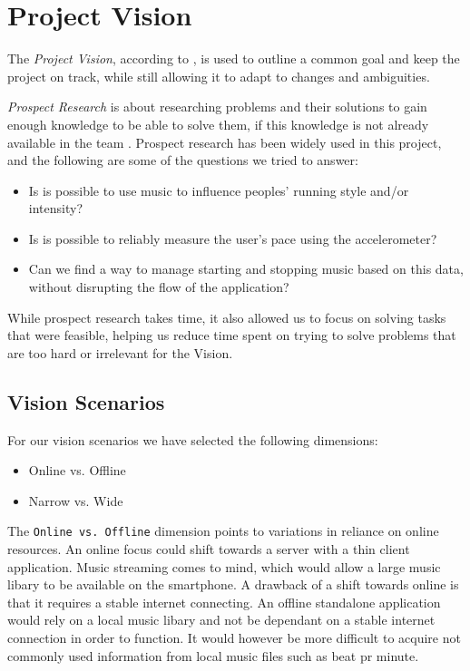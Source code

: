 \section{Project Vision}
The \textit{Project Vision}, according to \citet[ p. 104]{essence}, is used to outline a common goal and keep the project on track, while still allowing it to adapt to changes and ambiguities.

\noindent \textit{Prospect Research} is about researching problems and their solutions to gain enough knowledge to be able to solve them, if this knowledge is not already available in the team \citep[ pp. 104-105]{essence}.
Prospect research has been widely used in this project, and the following are some of the questions we tried to answer:

\begin{itemize}
	\item Is is possible to use music to influence peoples' running style and/or intensity?
	\item Is is possible to reliably measure the user's pace using the accelerometer?
	\item Can we find a way to manage starting and stopping music based on this data, without disrupting the flow of the application?
\end{itemize}

While prospect research takes time, it also allowed us to focus on solving tasks that were feasible, helping us reduce time spent on trying to solve problems that are too hard or irrelevant for the Vision.

\subsection*{Vision Scenarios}
For our vision scenarios \cite[ p. 127]{essence} we have selected the following dimensions:
\begin{itemize}
\item Online vs. Offline %
\item Narrow vs. Wide
\end{itemize}

The \texttt{Online vs. Offline} dimension points to variations in reliance on online resources. An online focus could shift  towards a server with a thin client application. Music streaming comes to mind, which would allow a large music libary to be available on the smartphone. A drawback of a shift towards online is that it requires a stable internet connecting. An offline standalone application would rely on a local music libary and not be dependant on a stable internet connection in order to function. It would however be more difficult to acquire not commonly used information from local music files such as beat pr minute.


